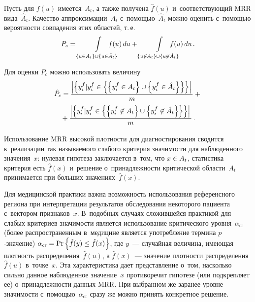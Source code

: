 \begin{multicols}{2}
     Пусть для $f(u)$ имеется~$A_t$, а также получена $\hat{f}(u)$ 
и~соответствующий MRR вида~$\hat{A}_t$. Качество аппроксимации~$A_t$ 
с~по\-мощью~$\hat{A}_t$ можно оценить с~по\-мощью вероятности совпадения 
этих областей, т.\,е. 
     $$
     P_c= \int\limits_{\{ u\in A_t\}\cup \{u\in \hat{A}_t\}} \hspace*{-6mm}
f(u)\,du+\int\limits_{\{u\not\in A_t\} \cup\{ u\not\in \hat{A}_t\}}\hspace*{-6mm} f(u)\,du\,.
     $$
     
     Для оценки  $P_c$ можно использовать величину
     \begin{multline*}
     \hat{P}_c= \displaystyle\frac{\displaystyle \left\vert \left\{ 
     y_i^f\vert y_i^f \in \left\{\left\{ y_i^f\in A_t\right\}\cup \left\{y_i^f\in 
\hat{A}_t\right\}\right\}\right\}\right\vert\mathstrut}{\displaystyle m\mathstrut}+{}\\
{}+\displaystyle\frac{\displaystyle \left\vert \left\{ y_i^f\vert y_i^f \in \left\{\left\{ y_i^f\not\in A_t\right\}\cup 
\left\{ y_i^f\not\in \hat{A}_t\right\}\right\}\right\}\right\vert\mathstrut}{\displaystyle m\mathstrut}\,.
     \end{multline*}
     
     Использование MRR высокой плотности для диагностирования сводится 
к~реализации так называемого слабого критерия значимости для наблюденного 
значения~$x$: нулевая гипотеза заключается в~том, что $x\hm\in A_t$, 
статистика критерия есть $\hat{f}(x)$ и~решение о~принадлежности 
критической об\-ласти~$A_t$ принимается при больших значениях~$\hat{f}(x)$.
     
     Для медицинской практики важна возможность использования 
референсного региона при интерпретации результатов обследования 
некоторого пациента с~вектором признаков~$x$. В~подобных случаях 
сложившейся практикой для слабых критериев значимости является 
использование критического уровня~$\alpha_{\mathrm{cr}}$ (более распространенным 
в~медицине является употребление термина $p$-зна\-че\-ние)  $\alpha_{\mathrm{cr}}\hm= 
\mathrm{Pr}\left\{ \hat{f}(y)\hm\leq \hat{f}(x)\right\}$, где $y$~--- случайная 
величина, имеющая плотность распределения~$\hat{f}(u)$, а $\hat{f}(x)$~--- 
значение плотности распределения~$\hat{f}(u)$ в~точке~$x$. Эта 
характеристика дает представление о~том, насколько сильно данное 
наблюденное значение~$x$ противоречит гипотезе (или подкрепляет ее) 
о~принадлежности данных MRR. При выбранном же заранее уровне 
значимости с~помощью~$\alpha_{\mathrm{cr}}$ сразу же можно принять конкретное 
решение. 

\vspace*{-9pt}


\end{multicols}
